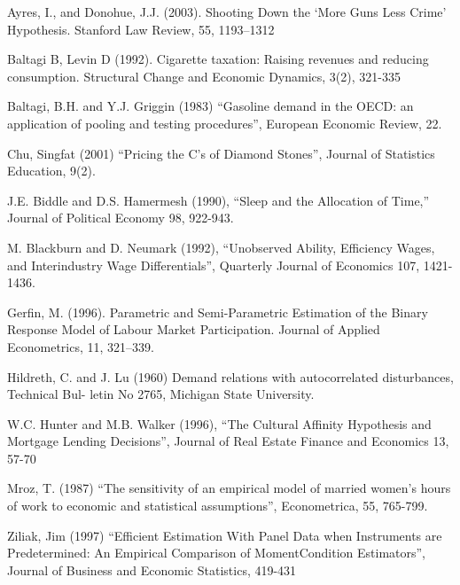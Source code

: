 \documentclass[12pt]{article}
\theoremstyle{remark}
\begin{document}
\newpage

\begin{thebibliography}{99}

 Ayres, I., and Donohue, J.J. (2003). Shooting Down the ‘More Guns Less Crime’ Hypothesis. 
Stanford Law Review, 55, 1193–1312
	
 Baltagi B, Levin D (1992). Cigarette taxation: Raising revenues and reducing consumption. 
Structural Change and Economic Dynamics, 3(2), 321-335
	
Baltagi, B.H. and Y.J. Griggin (1983) “Gasoline demand in the OECD: an application of pooling and 
testing procedures”, European Economic Review, 22.
	
Chu, Singfat (2001) “Pricing the C’s of Diamond Stones”, Journal of Statistics Education, 9(2).
	
J.E. Biddle and D.S. Hamermesh (1990), “Sleep and the Allocation of Time,” 
Journal of Political Economy 98, 922-943.
	
M. Blackburn and D. Neumark (1992), “Unobserved Ability, Efficiency Wages, and Interindustry Wage Differentials”, 
Quarterly Journal of Economics 107, 1421-1436.
	
Gerfin, M. (1996). Parametric and Semi-Parametric Estimation of the Binary Response Model of Labour Market Participation. 
Journal of Applied Econometrics, 11, 321–339.
	
Hildreth, C. and J. Lu (1960) Demand relations with autocorrelated disturbances, Technical Bul- letin No 2765, Michigan State University.
	
W.C. Hunter and M.B. Walker (1996), “The Cultural Affinity Hypothesis and Mortgage Lending Decisions”, 
Journal of Real Estate Finance and Economics 13, 57-70

Mroz, T. (1987) “The sensitivity of an empirical model of married women's hours of work to economic and statistical assumptions”, 
Econometrica, 55, 765-799.

Ziliak, Jim (1997) “Efficient Estimation With Panel Data when Instruments are Predetermined: An Empirical Comparison of Moment\-Condition Estimators”, 
Journal of Business and Economic Statistics, 419-431
	
\end{thebibliography}
\end{document}
